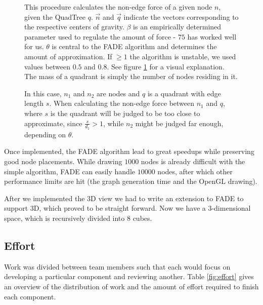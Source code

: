 \documentclass[a4paper,11pt,titlepage]{article}
\begin{document}
\begin{figure}[ht]
  \begin{minipage}[b]{0.5\linewidth}
    
    \caption{This procedure calculates the non-edge force of a given
      node \(n\), given the QuadTree \(q\). \(\vec{n}\) and
      \(\vec{q}\) indicate the vectors corresponding to the respective
      centers of gravity. \(\beta\) is an empirically determined
      parameter used to regulate the amount of force - \(75\) has
      worked well for us. \(\theta\) is central to the FADE algorithm
      and determines the amount of approximation. If \(\geq 1\) the
      algorithm is unstable, we used values between \(0.5\) and
      \(0.8\). See figure \ref{fig:theta} for a visual
      explanation. The mass of a quadrant is simply the number of
      nodes residing in it. }
    \label{proc:FADE}
  \end{minipage}
  \hspace{10pt}
  \begin{minipage}[b]{0.5\linewidth}
    \centering
    
    \caption{In this case, \(n_1\) and \(n_2\) are nodes and \(q\) is
      a quadrant with edge length \(s\). When calculating the non-edge
      force between \(n_1\) and \(q\), where \(s\) is the quadrant
      will be judged to be too close to approximate, since
      \(\frac{s}{d_1} > 1\), while \(n_2\) might be judged far enough,
      depending on \(\theta\).}
    \label{fig:theta}
  \end{minipage}
\end{figure}

Once implemented, the FADE algorithm lead to great speedups while
preserving good node placements. While drawing \(1000\) nodes is
already difficult with the simple algorithm, FADE can easily handle
\(10000\) nodes, after which other performance limits are hit (the
graph generation time and the OpenGL drawing).

After we implemented the 3D view we had to write an extension to FADE to support
3D, which proved to be straight forward. Now we have a 3-dimensional space,
which is recursively divided into $8$ cubes.

\subsection{Effort}

Work was divided between team members such that each would focus on
developing a particular component and reviewing another. Table
\ref{fig:effort} gives an overview of the distribution of work and the
amount of effort required to finish each component.
\end{document}
